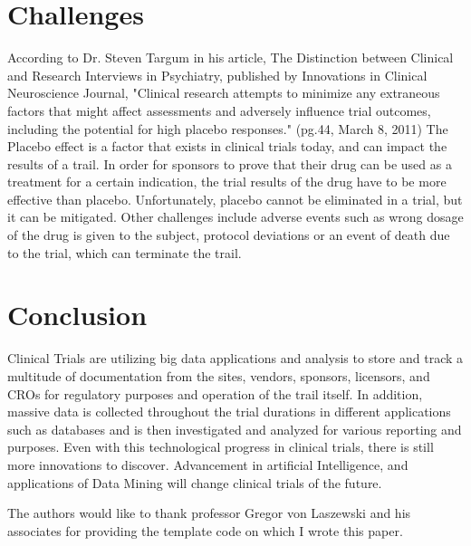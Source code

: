 \documentclass[sigconf]{acmart}
\begin{document}
\section{Challenges}

According to Dr. Steven Targum in his article, The Distinction between Clinical and Research Interviews in Psychiatry, published by Innovations in Clinical Neuroscience Journal, "Clinical research attempts to minimize any extraneous factors that might affect assessments and adversely influence trial outcomes, including the potential for high placebo responses." (pg.44, March 8, 2011) 
The Placebo effect is a factor that exists in clinical trials today, and can impact the results of a trail. 
In order for sponsors to prove that their drug can be used as a treatment for a certain indication, the trial results of the drug have to be more effective than placebo. Unfortunately, placebo cannot be eliminated in a trial, but it can be mitigated. 
Other challenges include adverse events such as wrong dosage of the drug is given to the subject, protocol deviations or an event of death due to the trial, which can terminate the trail. 

\section{Conclusion} 
Clinical Trials are utilizing big data applications and analysis to store and track a multitude of documentation from the sites, vendors, sponsors, licensors, and CROs for regulatory purposes and operation of the trail itself. 
In addition, massive data is collected throughout the trial durations in different applications such as databases and is then investigated and analyzed for various reporting and purposes. 
Even with this technological progress in clinical trials, there is still more innovations to discover. 
Advancement in artificial Intelligence, and applications of Data Mining will change clinical trials of the future. 
 
\begin{acks}

The authors would like to thank professor Gregor von Laszewski and his associates for providing the template code on which I wrote this paper.

\end{acks}


 
\end{document}
